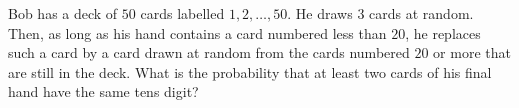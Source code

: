 Bob has a deck of $50$ cards labelled $1,2,\dots,50$. He draws $3$ cards at random. Then, as long as his hand contains a card numbered less than $20$, he replaces such a card by a card drawn at random from the cards numbered $20$ or more that are still in the deck. What is the probability that at least two cards of his final hand have the same tens digit?
